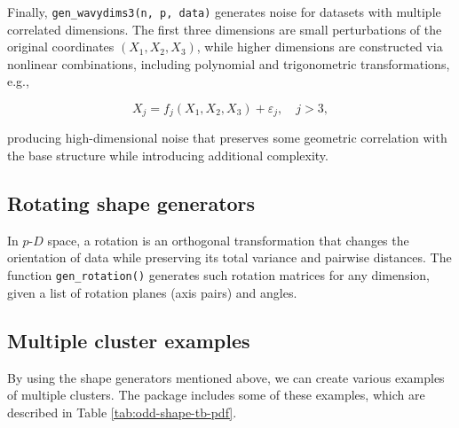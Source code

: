 Finally, \texttt{gen\_wavydims3(n,\ p,\ data)} generates noise for datasets with multiple correlated dimensions. The first three dimensions are small perturbations of the original coordinates \((X_1, X_2, X_3)\), while higher dimensions are constructed via nonlinear combinations, including polynomial and trigonometric transformations, e.g.,

\[
X_j = f_j(X_1, X_2, X_3) + \varepsilon_j, \quad j > 3,
\]

producing high-dimensional noise that preserves some geometric correlation with the base structure while introducing additional complexity.

\subsection{Rotating shape generators}\label{rotating-shape-generators}

In \(p\text{-}D\) space, a rotation is an orthogonal transformation that changes the orientation of data while preserving its total variance and pairwise distances. The function \texttt{gen\_rotation()} generates such rotation matrices for any dimension, given a list of rotation planes (axis pairs) and angles.

\subsection{Multiple cluster examples}\label{multiple-cluster-examples}

By using the shape generators mentioned above, we can create various examples of multiple clusters. The package includes some of these examples, which are described in Table \ref{tab:odd-shape-tb-pdf}.


